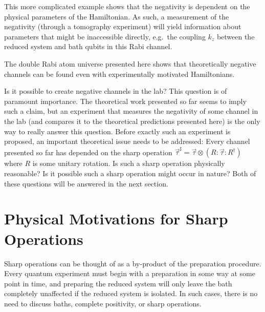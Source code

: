 This more complicated example shows that the negativity is dependent on the physical parameters of the Hamiltonian.  As such, a measurement of the negativity (through a tomography experiment) will yield information about parameters that might be inaccessible directly, e.g.\ the coupling $k_z$ between the reduced system and bath qubits in this Rabi channel.
 
The double Rabi atom universe presented here shows that theoretically negative channels can be found even with experimentally motivated Hamiltonians.  

Is it possible to create negative channels in the lab?  This question is of paramount importance.  The theoretical work presented so far seems to imply such a claim, but an experiment that measures the negativity of some channel in the lab (and compares it to the theoretical predictions presented here) is the only way to really answer this question.  Before exactly such an experiment is proposed, an important theoretical issue needs to be addressed:  Every channel presented so far has depended on the sharp operation $\vec{\tau}^\sharp=\vec{\tau}\otimes\left(R:\vec{\tau}:R^\dagger\right)$ where $R$ is some unitary rotation.  Is such a sharp operation physically reasonable?  Is it possible such a sharp operation might occur in nature?  Both of these questions will be answered in the next section.


\section{Physical Motivations for Sharp Operations}
\label{sec:sharp}

Sharp operations can be thought of as a by-product of the preparation procedure.  Every quantum experiment must begin with a preparation in some way at some point in time, and preparing the reduced system will only leave the bath completely unaffected if the reduced system is isolated.  In such cases, there is no need to discuss baths, complete positivity, or sharp operations.

